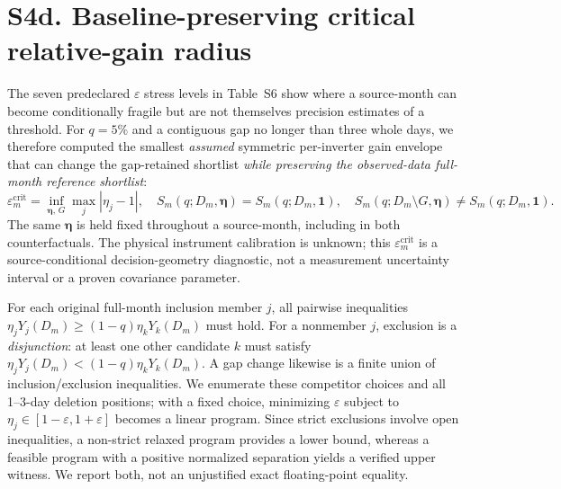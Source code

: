 \documentclass[11pt]{article}
\begin{document}
\section*{S4d. Baseline-preserving critical relative-gain radius}
The seven predeclared $\varepsilon$ stress levels in Table~S6 show where a source-month can become conditionally fragile but are not themselves precision estimates of a threshold. For $q=5\%$ and a contiguous gap no longer than three whole days, we therefore computed the smallest \emph{assumed} symmetric per-inverter gain envelope that can change the gap-retained shortlist \emph{while preserving the observed-data full-month reference shortlist}:
\[
\varepsilon_m^{\mathrm{crit}}=\inf_{\boldsymbol{\eta},\,G}
\max_j |\eta_j-1|,\quad
S_m(q;D_m,\boldsymbol{\eta})=S_m(q;D_m,\mathbf{1}),
\quad
S_m(q;D_m\setminus G,\boldsymbol{\eta})\ne S_m(q;D_m,\mathbf{1}).
\]
The same $\boldsymbol{\eta}$ is held fixed throughout a source-month, including in both counterfactuals. The physical instrument calibration is unknown; this $\varepsilon_m^{\mathrm{crit}}$ is a source-conditional decision-geometry diagnostic, not a measurement uncertainty interval or a proven covariance parameter.

For each original full-month inclusion member $j$, all pairwise inequalities $\eta_jY_j(D_m)\ge(1-q)\eta_kY_k(D_m)$ must hold. For a nonmember $j$, exclusion is a \emph{disjunction}: at least one other candidate $k$ must satisfy $\eta_jY_j(D_m)<(1-q)\eta_kY_k(D_m)$. A gap change likewise is a finite union of inclusion/exclusion inequalities. We enumerate these competitor choices and all 1--3-day deletion positions; with a fixed choice, minimizing $\varepsilon$ subject to $\eta_j\in[1-\varepsilon,1+\varepsilon]$ becomes a linear program. Since strict exclusions involve open inequalities, a non-strict relaxed program provides a lower bound, whereas a feasible program with a positive normalized separation yields a verified upper witness. We report both, not an unjustified exact floating-point equality.
\end{document}
